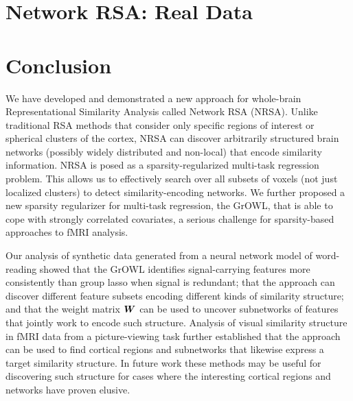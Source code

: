 \documentclass{article}
\begin{document}
	\section{Network RSA: Real Data}
        \label{wbrsa2}
	

	\section{Conclusion}

We have developed and demonstrated a new approach for whole-brain Representational
Similarity Analysis called Network RSA (NRSA). Unlike traditional RSA methods that
consider only specific regions of interest or spherical clusters of the cortex,  NRSA can
discover arbitrarily structured brain networks (possibly widely distributed and non-local)
that encode similarity information.  NRSA is posed as a sparsity-regularized multi-task
regression problem. This allows us to effectively search over all subsets of voxels (not
just localized clusters) to detect similarity-encoding networks.  We further proposed a
new sparsity regularizer for multi-task regression, the GrOWL, that is able to cope with
strongly correlated covariates, a serious challenge for sparsity-based approaches to fMRI
analysis.

Our analysis of synthetic data generated from a neural network model of word-reading
showed that the GrOWL identifies signal-carrying features more consistently than group
lasso when signal is redundant; that the approach can discover different feature subsets
encoding different kinds of similarity structure; and that the weight matrix $\boldsymbol{W}$ can be
used to uncover subnetworks of features that jointly work to encode such structure.
Analysis of visual similarity structure in fMRI data from a picture-viewing task further
established that the approach can be used to find cortical regions and subnetworks that
likewise express a target similarity structure. In future work these methods may be useful
for discovering such structure for cases where the interesting cortical regions and
networks have proven elusive.




\end{document}
